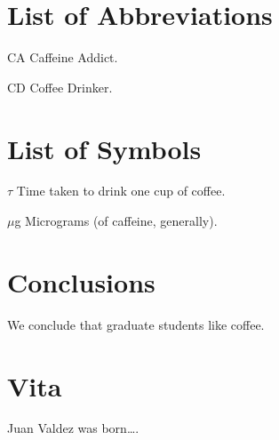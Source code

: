 \documentclass[draftthesis,fullpage]{uiucthesis}
\begin{document}
\tableofcontents
\listoftables
\listoffigures

\chapter{List of Abbreviations}

\begin{symbollist*}
\item[CA] Caffeine Addict.
\item[CD] Coffee Drinker.
\end{symbollist*}

\chapter{List of Symbols}

\begin{symbollist}[0.7in]
\item[$\tau$] Time taken to drink one cup of coffee.
\item[$\mu$g] Micrograms (of caffeine, generally).
\end{symbollist}

\mainmatter






\chapter{Conclusions}

We conclude that graduate students like coffee.

\appendix*



\backmatter



\chapter{Vita}

Juan Valdez was born\ldots.
\end{document}
